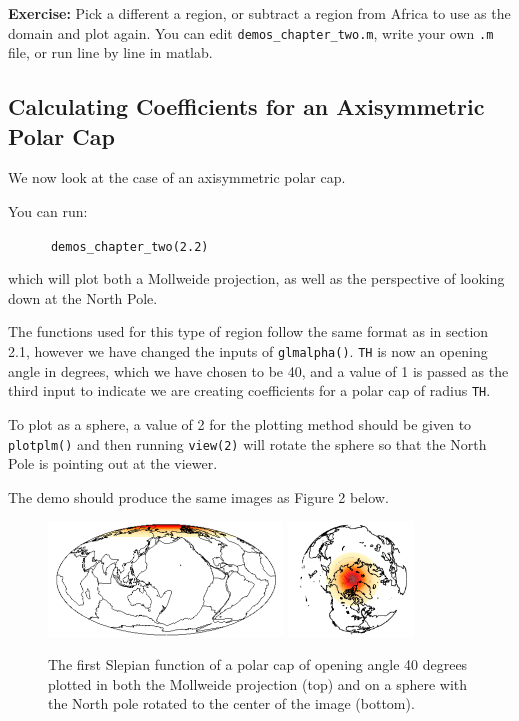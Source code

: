 \documentclass[11pt]{article}
\begin{document}
\textbf{Exercise:} Pick a different a region, or subtract a region from Africa to use as the domain and plot again. You can edit \verb|demos_chapter_two.m|, write your own \verb|.m| file, or run line by line in matlab.
 

\subsection{Calculating Coefficients for an Axisymmetric Polar Cap}

We now look at the case of an axisymmetric polar cap.

You can run:

\verb|		demos_chapter_two(2.2)|

which will plot both a Mollweide projection, as well as the perspective of looking down at the North Pole.

The functions used for this type of region follow the same format as in section 2.1, however we have changed the inputs of \verb|glmalpha()|. \verb|TH| is now an opening angle in degrees, which we have chosen to be 40, and a value of 1 is passed as the third input to indicate we are creating coefficients for a polar cap of radius \verb|TH|.

To plot as a sphere, a value of 2 for the plotting method should be given to \verb|plotplm()| and then running \verb|view(2)| will rotate the sphere so that the North Pole is pointing out at the viewer.

The demo should produce the same images as Figure 2 below.

\begin{figure}[H]
  \centering
  \includegraphics[height=1.2in]{figures/figure2A.png}
  \includegraphics[height=1.2in]{figures/figure2B.png}
  \caption{The first Slepian function of a polar cap of opening angle 40 degrees plotted in both the Mollweide projection (top) and on a sphere with the North pole rotated to the center of the image (bottom).}
   \label{figure2}
\end{figure}
\end{document}
